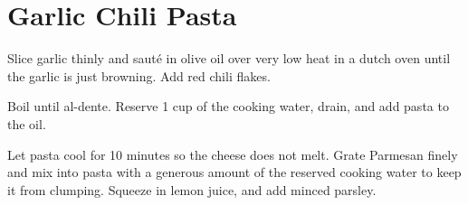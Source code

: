 \section{Garlic Chili Pasta}
\begin{recipe}



Slice garlic thinly and sauté in olive oil over very low heat in a dutch oven until the garlic is just browning. Add red chili flakes.


Boil until al-dente. Reserve 1 cup of the cooking water, drain, and add pasta to the oil.



Let pasta cool for 10 minutes so the cheese does not melt.
Grate Parmesan finely and mix into pasta with a generous amount of the reserved cooking water to keep it from clumping.
Squeeze in lemon juice, and add minced parsley.

\end{recipe}
